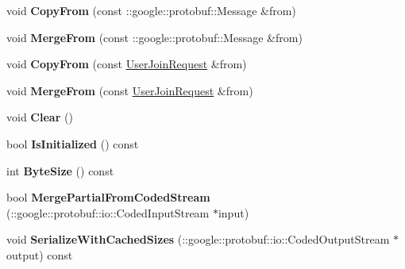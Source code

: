 \begin{DoxyCompactItemize}
\item 
\hypertarget{classSimpleChat_1_1UserJoinRequest_a9d76ddfb6ab5b38ddbe0ba0d1b2ebf0f}{void {\bfseries Copy\-From} (const \-::google\-::protobuf\-::\-Message \&from)}\label{classSimpleChat_1_1UserJoinRequest_a9d76ddfb6ab5b38ddbe0ba0d1b2ebf0f}

\item 
\hypertarget{classSimpleChat_1_1UserJoinRequest_a012014877340a6159c67ae1ce9fd56ba}{void {\bfseries Merge\-From} (const \-::google\-::protobuf\-::\-Message \&from)}\label{classSimpleChat_1_1UserJoinRequest_a012014877340a6159c67ae1ce9fd56ba}

\item 
\hypertarget{classSimpleChat_1_1UserJoinRequest_aed9ca7e9ba259a3b11d7112f1495199d}{void {\bfseries Copy\-From} (const \hyperlink{classSimpleChat_1_1UserJoinRequest}{User\-Join\-Request} \&from)}\label{classSimpleChat_1_1UserJoinRequest_aed9ca7e9ba259a3b11d7112f1495199d}

\item 
\hypertarget{classSimpleChat_1_1UserJoinRequest_a3ca2c2b4215c09d18b20e80763003e58}{void {\bfseries Merge\-From} (const \hyperlink{classSimpleChat_1_1UserJoinRequest}{User\-Join\-Request} \&from)}\label{classSimpleChat_1_1UserJoinRequest_a3ca2c2b4215c09d18b20e80763003e58}

\item 
\hypertarget{classSimpleChat_1_1UserJoinRequest_ad76d8b89c423d79df14823769d8ecb3d}{void {\bfseries Clear} ()}\label{classSimpleChat_1_1UserJoinRequest_ad76d8b89c423d79df14823769d8ecb3d}

\item 
\hypertarget{classSimpleChat_1_1UserJoinRequest_a568cfe228f12edb638d41b6abcb29882}{bool {\bfseries Is\-Initialized} () const }\label{classSimpleChat_1_1UserJoinRequest_a568cfe228f12edb638d41b6abcb29882}

\item 
\hypertarget{classSimpleChat_1_1UserJoinRequest_aa14f063d5d75fbec1b2b5f73a94d4bb7}{int {\bfseries Byte\-Size} () const }\label{classSimpleChat_1_1UserJoinRequest_aa14f063d5d75fbec1b2b5f73a94d4bb7}

\item 
\hypertarget{classSimpleChat_1_1UserJoinRequest_afbe311545f5d9162e81afb317c781092}{bool {\bfseries Merge\-Partial\-From\-Coded\-Stream} (\-::google\-::protobuf\-::io\-::\-Coded\-Input\-Stream $\ast$input)}\label{classSimpleChat_1_1UserJoinRequest_afbe311545f5d9162e81afb317c781092}

\item 
\hypertarget{classSimpleChat_1_1UserJoinRequest_a2f379a15168279f746bc4001b2c13e6c}{void {\bfseries Serialize\-With\-Cached\-Sizes} (\-::google\-::protobuf\-::io\-::\-Coded\-Output\-Stream $\ast$output) const }\label{classSimpleChat_1_1UserJoinRequest_a2f379a15168279f746bc4001b2c13e6c}


\end{DoxyCompactItemize}
